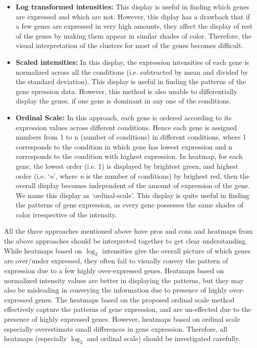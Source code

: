 \documentclass[12pt, oneside, letterpaper]{article}
\begin{document}
\begin{itemize}

\item \textbf{Log transformed intensities:} 
	This display is useful in finding which genes are expressed
	and which are not. However, this diplay has a drawback that
	if a few genes are expressed in very high amounts, they
	affect the display of rest of the genes by making them
	appear in similar shades of color.  Therefore, the visual
	interpretation of the clusters for most of the genes becomes
	difficult.
 
\item \textbf{Scaled intensities:} 
	In this display, the expression intensities of each gene is
	normalized across all the conditions (i.e. subtracted by
	mean and divided by the standard deviation). This display is
	useful in finding the patterns of the gene epression
	data. However, this method is also unable to differentially
	display the genes, if one gene is dominant in any one of the
	conditions.

\item \textbf{Ordinal Scale:}
	In this approach, each gene is ordered according to its
	expression values across different conditions. Hence each
	gene is assigned numbers from 1 to n (number of conditions)
	in different conditions, where 1 corresponds to the
	condition in which gene has lowest expression and n
	corresponds to the condition with highest expression. In
	heatmap, for each gene, the lowest order (i.e. 1) is
	displayed by brightest green, and highest order
	(i.e. `\textit{n}', where \textit{n} is the number of
	conditions) by brighest red, then the overall display
	becomes independent of the amount of expression of the gene.
	We name this display as `ordinal-scale'. This display is
	quite useful in finding the patterns of gene expression, as
	every gene possesses the same shades of color irrespective
	of the intensity.

\end{itemize}

	All the three approaches mentioned above have pros and cons
	and heatmaps from the above approaches should be interpreted
	together to get clear understanding.  While heatmaps based
	on $\log_2$ intensities give the overall picture of which
	genes are over/under expressed, they often fail to visually
	convey the pattern of expression due to a few highly
	over-expressed genes. Heatmaps based on normalized intensity
	values are better in displaying the patterns, but they may
	also be misleading in conveying the information due to
	presence of highly over-expressed genes.  The heatmaps based
	on the proposed ordinal scale method effectively capture the
	patterns of gene expression, and are un-effected due to the
	presence of highly expressed genes. However, heatmaps based
	on ordinal scale especially overestimate small differences
	in gene expression.  Therefore, all heatmaps (especially
	$\log_2$ and ordinal scale) should be investigated
	carefully.
\end{document}
